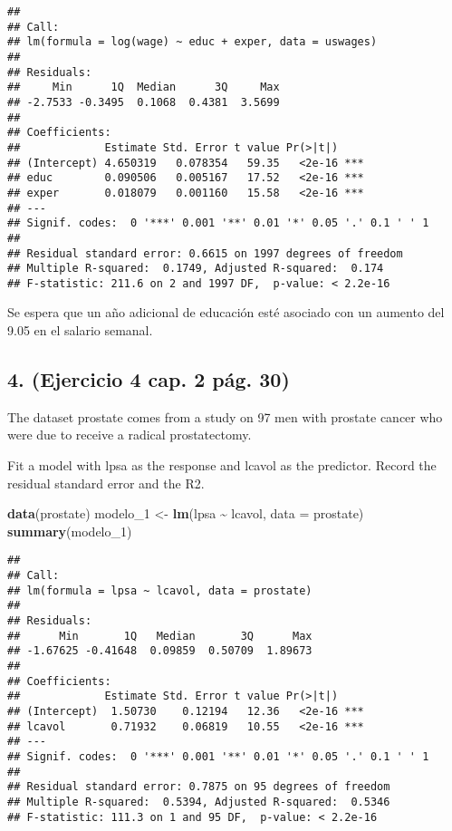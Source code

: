\documentclass[
]{article}
\newenvironment{Shaded}{\begin{snugshade}}{\end{snugshade}}
\newcommand{\AttributeTok}[1]{\textcolor[rgb]{0.13,0.29,0.53}{#1}}
\newcommand{\FunctionTok}[1]{\textcolor[rgb]{0.13,0.29,0.53}{\textbf{#1}}}
\newcommand{\NormalTok}[1]{#1}
\newcommand{\OtherTok}[1]{\textcolor[rgb]{0.56,0.35,0.01}{#1}}
\newcommand{\SpecialCharTok}[1]{\textcolor[rgb]{0.81,0.36,0.00}{\textbf{#1}}}
\begin{document}
\begin{verbatim}
## 
## Call:
## lm(formula = log(wage) ~ educ + exper, data = uswages)
## 
## Residuals:
##     Min      1Q  Median      3Q     Max 
## -2.7533 -0.3495  0.1068  0.4381  3.5699 
## 
## Coefficients:
##             Estimate Std. Error t value Pr(>|t|)    
## (Intercept) 4.650319   0.078354   59.35   <2e-16 ***
## educ        0.090506   0.005167   17.52   <2e-16 ***
## exper       0.018079   0.001160   15.58   <2e-16 ***
## ---
## Signif. codes:  0 '***' 0.001 '**' 0.01 '*' 0.05 '.' 0.1 ' ' 1
## 
## Residual standard error: 0.6615 on 1997 degrees of freedom
## Multiple R-squared:  0.1749, Adjusted R-squared:  0.174 
## F-statistic: 211.6 on 2 and 1997 DF,  p-value: < 2.2e-16
\end{verbatim}

Se espera que un año adicional de educación esté asociado con un aumento
del 9.05 en el salario semanal.

\hypertarget{ejercicio-4-cap.-2-puxe1g.-30}{%
\subsection{4. (Ejercicio 4 cap. 2 pág.
30)}\label{ejercicio-4-cap.-2-puxe1g.-30}}

The dataset prostate comes from a study on 97 men with prostate cancer
who were due to receive a radical prostatectomy.

Fit a model with lpsa as the response and lcavol as the predictor.
Record the residual standard error and the R2.

\begin{Shaded}
\begin{Highlighting}[]
\FunctionTok{data}\NormalTok{(prostate)}
\NormalTok{modelo\_1 }\OtherTok{\textless{}{-}} \FunctionTok{lm}\NormalTok{(lpsa }\SpecialCharTok{\textasciitilde{}}\NormalTok{ lcavol, }\AttributeTok{data =}\NormalTok{ prostate)}
\FunctionTok{summary}\NormalTok{(modelo\_1)}
\end{Highlighting}
\end{Shaded}

\begin{verbatim}
## 
## Call:
## lm(formula = lpsa ~ lcavol, data = prostate)
## 
## Residuals:
##      Min       1Q   Median       3Q      Max 
## -1.67625 -0.41648  0.09859  0.50709  1.89673 
## 
## Coefficients:
##             Estimate Std. Error t value Pr(>|t|)    
## (Intercept)  1.50730    0.12194   12.36   <2e-16 ***
## lcavol       0.71932    0.06819   10.55   <2e-16 ***
## ---
## Signif. codes:  0 '***' 0.001 '**' 0.01 '*' 0.05 '.' 0.1 ' ' 1
## 
## Residual standard error: 0.7875 on 95 degrees of freedom
## Multiple R-squared:  0.5394, Adjusted R-squared:  0.5346 
## F-statistic: 111.3 on 1 and 95 DF,  p-value: < 2.2e-16
\end{verbatim}
\end{document}
